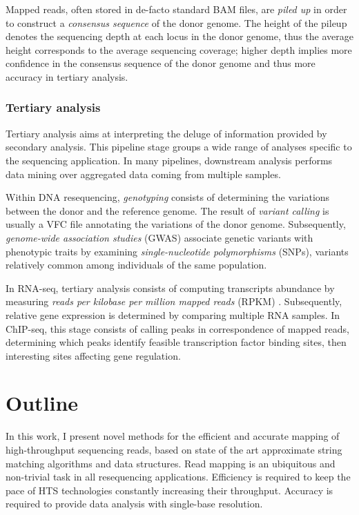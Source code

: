 Mapped reads, often stored in de-facto standard BAM files, are \emph{piled up} in order to construct a \emph{consensus sequence} of the donor genome.
The height of the pileup denotes the sequencing depth at each locus in the donor genome, thus the average height corresponds to the average sequencing coverage;
higher depth implies more confidence in the consensus sequence of the donor genome and thus more accuracy in tertiary analysis.

\subsubsection{Tertiary analysis}

Tertiary analysis aims at interpreting the deluge of information provided by secondary analysis.
This pipeline stage groups a wide range of analyses specific to the sequencing application.
In many pipelines, downstream analysis performs data mining over aggregated data coming from multiple samples.

Within DNA resequencing, \emph{genotyping} consists of determining the variations between the donor and the reference genome.
The result of \emph{variant calling} is usually a VFC file annotating the variations of the donor genome.
Subsequently, \emph{genome-wide association studies} (GWAS) associate genetic variants with phenotypic traits by examining \emph{single-nucleotide polymorphisms} (SNPs), variants relatively common among individuals of the same population.

In RNA-seq, tertiary analysis consists of computing transcripts abundance by measuring \emph{reads per kilobase per million mapped reads} (RPKM) \citep{rnaseq}.
Subsequently, relative gene expression is determined by comparing multiple RNA samples.
In ChIP-seq, this stage consists of calling peaks in correspondence of mapped reads, determining which peaks identify feasible transcription factor binding sites, then interesting sites affecting gene regulation.


\section{Outline}

In this work, I present novel methods for the efficient and accurate mapping of high-throughput sequencing reads, based on state of the art approximate string matching algorithms and data structures.
Read mapping is an ubiquitous and non-trivial task in all resequencing applications.
Efficiency is required to keep the pace of HTS technologies constantly increasing their throughput.
Accuracy is required to provide data analysis with single-base resolution.

